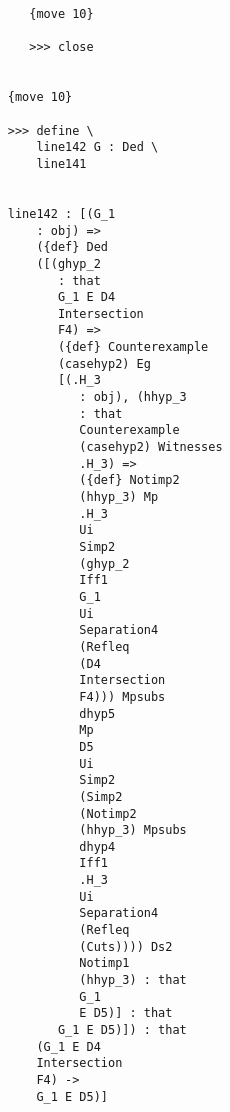 \documentclass[12pt]{article}
\begin{document}
\begin{verbatim}
                                 {move 10}

                                 >>> close


                              {move 10}

                              >>> define \
                                  line142 G : Ded \
                                  line141


                              line142 : [(G_1 
                                  : obj) => 
                                  ({def} Ded 
                                  ([(ghyp_2 
                                     : that 
                                     G_1 E D4 
                                     Intersection 
                                     F4) => 
                                     ({def} Counterexample 
                                     (casehyp2) Eg 
                                     [(.H_3 
                                        : obj), (hhyp_3 
                                        : that 
                                        Counterexample 
                                        (casehyp2) Witnesses 
                                        .H_3) => 
                                        ({def} Notimp2 
                                        (hhyp_3) Mp 
                                        .H_3 
                                        Ui 
                                        Simp2 
                                        (ghyp_2 
                                        Iff1 
                                        G_1 
                                        Ui 
                                        Separation4 
                                        (Refleq 
                                        (D4 
                                        Intersection 
                                        F4))) Mpsubs 
                                        dhyp5 
                                        Mp 
                                        D5 
                                        Ui 
                                        Simp2 
                                        (Simp2 
                                        (Notimp2 
                                        (hhyp_3) Mpsubs 
                                        dhyp4 
                                        Iff1 
                                        .H_3 
                                        Ui 
                                        Separation4 
                                        (Refleq 
                                        (Cuts)))) Ds2 
                                        Notimp1 
                                        (hhyp_3) : that 
                                        G_1 
                                        E D5)] : that 
                                     G_1 E D5)]) : that 
                                  (G_1 E D4 
                                  Intersection 
                                  F4) -> 
                                  G_1 E D5)]



\end{verbatim}
\end{document}
